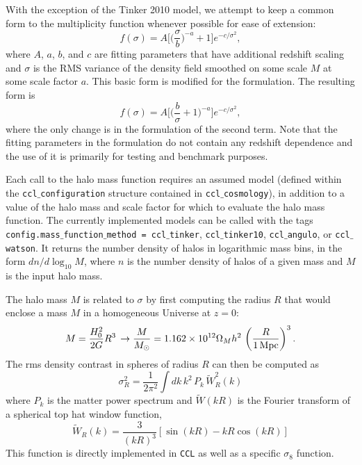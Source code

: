 \documentclass[\docopts]{\docclass}
\begin{document}
With the exception of the Tinker 2010 model, we attempt to keep a common form to the multiplicity function whenever possible for ease of extension:
\begin{equation}
f(\sigma)=A\Big[\Big(\frac{\sigma}{b}\Big)^{-a}+1\Big]e^{-c/{\sigma}^2},
\end{equation}
where $A$, $a$, $b$, and $c$ are fitting parameters that have additional redshift scaling and $\sigma$ is the RMS variance of the density field smoothed on some scale $M$ at some scale factor $a$. This basic form is modified for the \citet{Angulo2012} formulation. The resulting form is
\begin{equation}
f(\sigma)=A\Big[\Big(\frac{b}{\sigma}+1\Big)^{-a}\Big]e^{-c/{\sigma}^2},
\end{equation}
where the only change is in the formulation of the second term. Note that the fitting parameters in the \citet{Angulo2012} formulation do not contain any redshift dependence and the use of it is primarily for testing and benchmark purposes.

Each call to the halo mass function requires an assumed model (defined within the {\tt ccl$\_$configuration} structure contained in {\tt ccl$\_$cosmology}), in addition to a value of the halo mass and scale factor for which to evaluate the halo mass function. The currently implemented models can be called with the tags {\tt config.mass$\_$function$\_$method = ccl$\_$tinker}, {\tt ccl$\_$tinker10}, {\tt ccl$\_$angulo}, or {\tt ccl$\_$watson}. It returns the number density of halos in logarithmic mass bins, in the form $dn/d\log_{10}{M}$, where $n$ is the number density of halos of a given mass and $M$ is the input halo mass.

The halo mass $M$ is related to $\sigma$ by first computing the radius $R$ that would enclose a mass $M$ in a homogeneous Universe at $z=0$:
\begin{equation}
  M=\frac{H_0^2}{2G}R^3\,\rightarrow \frac{M}{M_\odot}=1.162\times10^{12}\Omega_Mh^2\,\left(\frac{R}{1\,{\rm Mpc}}\right)^3.
\end{equation}
The rms density contrast in spheres of radius $R$ can then be computed as
\begin{equation}
  \sigma_R^2 = \frac{1}{2\pi^2}\int dk\,k^2\,P_k\,\tilde{W}_R^2(k)
  \label{eq:sigR}
\end{equation}
where $P_k$ is the matter power spectrum and $\tilde{W}(kR)$ is the Fourier transform of a spherical top hat window function,
\begin{equation}
\tilde{W}_R(k) = \frac{3}{(kR)^3}[\sin(kR)-kR\cos(kR)]
\end{equation}
%
This function is directly implemented in {\tt CCL} as well as a specific $\sigma_8$ function.
\end{document}
